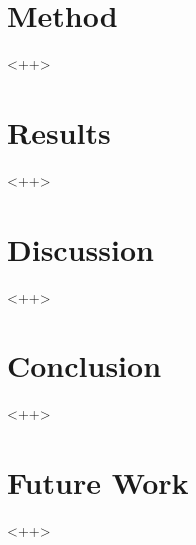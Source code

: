 \documentclass[12pt]{article}
\begin{document}
	\section{Method}
	<++>

	\section{Results}
	<++>

	\section{Discussion}
	<++>

	\section{Conclusion}
	<++>

	\section{Future Work}
	<++>

	\pagebreak
	
	
\end{document}
